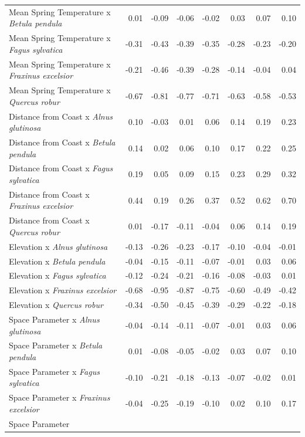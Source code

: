 \documentclass{article}\usepackage[]{graphicx}\usepackage[]{color}
\begin{document}
\begin{longtable}{lrrrrrrr}
  Mean Spring 
Temperature
x\textit{ Betula pendula} & 0.01 & -0.09 & -0.06 & -0.02 & 0.03 & 0.07 & 0.10 \\ 
  Mean Spring 
Temperature
x\textit{ Fagus sylvatica} & -0.31 & -0.43 & -0.39 & -0.35 & -0.28 & -0.23 & -0.20 \\ 
  Mean Spring 
Temperature
x\textit{ Fraxinus excelsior} & -0.21 & -0.46 & -0.39 & -0.28 & -0.14 & -0.04 & 0.04 \\ 
  Mean Spring 
Temperature
x\textit{ Quercus robur} & -0.67 & -0.81 & -0.77 & -0.71 & -0.63 & -0.58 & -0.53 \\ 
  Distance from 
Coast
x\textit{ Alnus glutinosa} & 0.10 & -0.03 & 0.01 & 0.06 & 0.14 & 0.19 & 0.23 \\ 
  Distance from 
Coast
x\textit{ Betula pendula} & 0.14 & 0.02 & 0.06 & 0.10 & 0.17 & 0.22 & 0.25 \\ 
  Distance from 
Coast
x\textit{ Fagus sylvatica} & 0.19 & 0.05 & 0.09 & 0.15 & 0.23 & 0.29 & 0.32 \\ 
  Distance from 
Coast
x\textit{ Fraxinus excelsior} & 0.44 & 0.19 & 0.26 & 0.37 & 0.52 & 0.62 & 0.70 \\ 
  Distance from 
Coast
x\textit{ Quercus robur} & 0.01 & -0.17 & -0.11 & -0.04 & 0.06 & 0.14 & 0.19 \\ 
  Elevation
x\textit{ Alnus glutinosa} & -0.13 & -0.26 & -0.23 & -0.17 & -0.10 & -0.04 & -0.01 \\ 
  Elevation
x\textit{ Betula pendula} & -0.04 & -0.15 & -0.11 & -0.07 & -0.01 & 0.03 & 0.06 \\ 
  Elevation
x\textit{ Fagus sylvatica} & -0.12 & -0.24 & -0.21 & -0.16 & -0.08 & -0.03 & 0.01 \\ 
  Elevation
x\textit{ Fraxinus excelsior} & -0.68 & -0.95 & -0.87 & -0.75 & -0.60 & -0.49 & -0.42 \\ 
  Elevation
x\textit{ Quercus robur} & -0.34 & -0.50 & -0.45 & -0.39 & -0.29 & -0.22 & -0.18 \\ 
  Space Parameter
x\textit{ Alnus glutinosa} & -0.04 & -0.14 & -0.11 & -0.07 & -0.01 & 0.03 & 0.06 \\ 
  Space Parameter
x\textit{ Betula pendula} & 0.01 & -0.08 & -0.05 & -0.02 & 0.03 & 0.07 & 0.10 \\ 
  Space Parameter
x\textit{ Fagus sylvatica} & -0.10 & -0.21 & -0.18 & -0.13 & -0.07 & -0.02 & 0.01 \\ 
  Space Parameter
x\textit{ Fraxinus excelsior} & -0.04 & -0.25 & -0.19 & -0.10 & 0.02 & 0.10 & 0.17 \\ 
  Space Parameter

\end{longtable}
\end{document}
